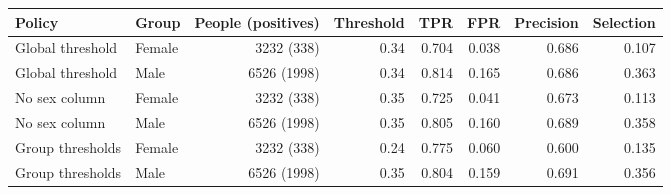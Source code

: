 \begin{tabular}{llrrrrrr}
\toprule
Policy & Group & People (positives) & Threshold & TPR & FPR & Precision & Selection \\
\midrule
Global threshold & Female & 3232 (338) & 0.34 & 0.704 & 0.038 & 0.686 & 0.107 \\
Global threshold & Male & 6526 (1998) & 0.34 & 0.814 & 0.165 & 0.686 & 0.363 \\
No sex column & Female & 3232 (338) & 0.35 & 0.725 & 0.041 & 0.673 & 0.113 \\
No sex column & Male & 6526 (1998) & 0.35 & 0.805 & 0.160 & 0.689 & 0.358 \\
Group thresholds & Female & 3232 (338) & 0.24 & 0.775 & 0.060 & 0.600 & 0.135 \\
Group thresholds & Male & 6526 (1998) & 0.35 & 0.804 & 0.159 & 0.691 & 0.356 \\
\bottomrule
\end{tabular}
